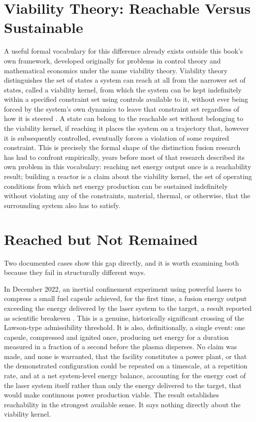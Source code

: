 \documentclass[11pt]{book}
\begin{document}
\section{Viability Theory: Reachable Versus Sustainable}

A useful formal vocabulary for this difference already exists outside this book's own framework, developed originally for problems in control theory and mathematical economics under the name viability theory. Viability theory distinguishes the set of states a system can reach at all from the narrower set of states, called a viability kernel, from which the system can be kept indefinitely within a specified constraint set using controls available to it, without ever being forced by the system's own dynamics to leave that constraint set regardless of how it is steered \cite{aubin1991}. A state can belong to the reachable set without belonging to the viability kernel, if reaching it places the system on a trajectory that, however it is subsequently controlled, eventually forces a violation of some required constraint. This is precisely the formal shape of the distinction fusion research has had to confront empirically, years before most of that research described its own problem in this vocabulary: reaching net energy output once is a reachability result; building a reactor is a claim about the viability kernel, the set of operating conditions from which net energy production can be sustained indefinitely without violating any of the constraints, material, thermal, or otherwise, that the surrounding system also has to satisfy.

\section{Reached but Not Remained}

Two documented cases show this gap directly, and it is worth examining both because they fail in structurally different ways.

In December 2022, an inertial confinement experiment using powerful lasers to compress a small fuel capsule achieved, for the first time, a fusion energy output exceeding the energy delivered by the laser system to the target, a result reported as scientific breakeven \cite{abushawareb2024}. This is a genuine, historically significant crossing of the Lawson-type admissibility threshold. It is also, definitionally, a single event: one capsule, compressed and ignited once, producing net energy for a duration measured in a fraction of a second before the plasma disperses. No claim was made, and none is warranted, that the facility constitutes a power plant, or that the demonstrated configuration could be repeated on a timescale, at a repetition rate, and at a net system-level energy balance, accounting for the energy cost of the laser system itself rather than only the energy delivered to the target, that would make continuous power production viable. The result establishes reachability in the strongest available sense. It says nothing directly about the viability kernel.
\end{document}

